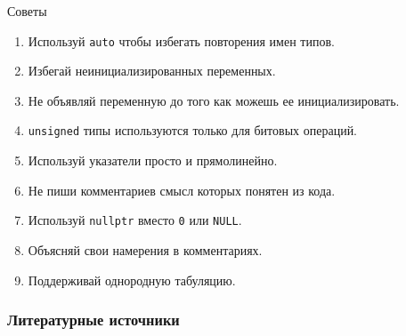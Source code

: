 \documentclass[
    9pt,
    hyperref={pdfencoding=unicode}
    ]{beamer}
\theoremstyle{definition}
\begin{document}
\begin{frame}[t,allowframebreaks]{Советы}
\begin{enumerate}
        \item Используй \texttt{auto} чтобы избегать повторения имен типов.
        \item Избегай неинициализированных переменных.
        \item Не объявляй переменную до того как можешь ее инициализировать.
        \item \texttt{unsigned} типы используются только для битовых операций.
        \item Используй указатели просто и прямолинейно.
        \item Не пиши комментариев смысл которых понятен из кода.
        \item Используй \texttt{nullptr} вместо \texttt{0} или \texttt{NULL}.
        \item Объясняй свои намерения в комментариях.
        \item Поддерживай однородную табуляцию.
    \end{enumerate}
\end{frame}

\begin{frame}[t,allowframebreaks]
    \frametitle{Литературные источники}
    
    \nocite{*}
    \printbibliography
\end{frame}
\end{document}
